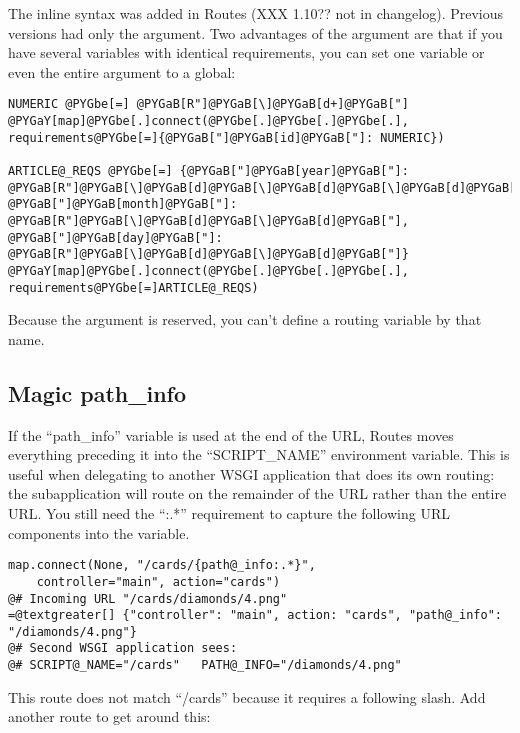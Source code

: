 \documentclass[letterpaper,10pt,english]{manual}
\begin{document}
The inline syntax was added in Routes (XXX 1.10?? not in changelog).  Previous
versions had only the  argument.  Two advantages of the
 argument are that if you have several variables with identical
requirements, you can set one variable or even the entire argument to a
global:

\begin{Verbatim}[commandchars=@\[\]]
NUMERIC @PYGbe[=] @PYGaB[R"]@PYGaB[\]@PYGaB[d+]@PYGaB["]
@PYGaY[map]@PYGbe[.]connect(@PYGbe[.]@PYGbe[.]@PYGbe[.], requirements@PYGbe[=]{@PYGaB["]@PYGaB[id]@PYGaB["]: NUMERIC})

ARTICLE@_REQS @PYGbe[=] {@PYGaB["]@PYGaB[year]@PYGaB["]: @PYGaB[R"]@PYGaB[\]@PYGaB[d]@PYGaB[\]@PYGaB[d]@PYGaB[\]@PYGaB[d]@PYGaB[\]@PYGaB[d]@PYGaB["], @PYGaB["]@PYGaB[month]@PYGaB["]: @PYGaB[R"]@PYGaB[\]@PYGaB[d]@PYGaB[\]@PYGaB[d]@PYGaB["], @PYGaB["]@PYGaB[day]@PYGaB["]: @PYGaB[R"]@PYGaB[\]@PYGaB[d]@PYGaB[\]@PYGaB[d]@PYGaB["]}
@PYGaY[map]@PYGbe[.]connect(@PYGbe[.]@PYGbe[.]@PYGbe[.], requirements@PYGbe[=]ARTICLE@_REQS)
\end{Verbatim}

Because the argument  is reserved, you can't define a routing
variable by that name.


\subsection{Magic path\_info}

If the ``path\_info'' variable is used at the end of the URL, Routes moves
everything preceding it into the ``SCRIPT\_NAME'' environment variable.  This is
useful when delegating to another WSGI application that does its own routing:
the subapplication will route on the remainder of the URL rather than the
entire URL.  You still
need the ``:.*'' requirement to capture the following URL components into the
variable.

\begin{Verbatim}[commandchars=@\[\]]
map.connect(None, "/cards/{path@_info:.*}",
    controller="main", action="cards")
@# Incoming URL "/cards/diamonds/4.png"
=@textgreater[] {"controller": "main", action: "cards", "path@_info": "/diamonds/4.png"}
@# Second WSGI application sees:
@# SCRIPT@_NAME="/cards"   PATH@_INFO="/diamonds/4.png"
\end{Verbatim}

This route does not match ``/cards'' because it requires a following slash.
Add another route to get around this:
\end{document}
